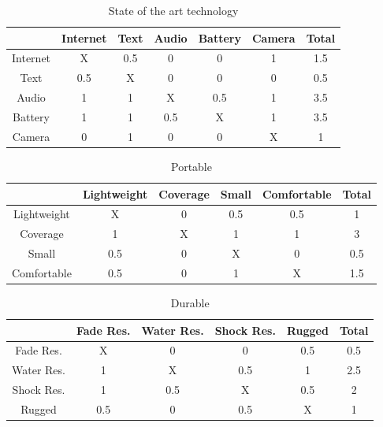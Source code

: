 \begin{enumerate}
\begin{onlysolution}
\begin{enumerate}
    \begin{table}
    \caption{State of the art technology}
    \begin{tabular}{c|c|c|c|c|c|c}
    				& Internet		& Text		& Audio	& Battery	 	& Camera	& Total			\\ \hline    			
	Internet		& X 			& 0.5		& 0			& 0				& 1			& 1.5 			\\ \hline    			
	Text			& 0.5 			& X			& 0			& 0				& 0	 		& 0.5		\\ \hline    			
	Audio		&  1			& 1			& X			& 0.5			& 1 		& 3.5		\\ \hline    			    
	Battery		&  1			& 1			& 0.5		& 	X			& 1 		& 3.5		\\ \hline    			
	Camera		& 0				& 1			& 0			& 0				& X 		& 1	
	\end{tabular}
	\end{table}
			
    \begin{table}
    \caption{Portable}
    \begin{tabular}{c|c|c|c|c|c}
    				& Lightweight	& Coverage	& Small		& Comfortable 	& Total			\\ \hline    			
	Lightweight	& X 			& 0			& 0.5		& 0.5			& 1 			\\ \hline    			
	Coverage	& 1	 			& X			& 1			& 1				& 3	 			\\ \hline    			
	Small		&  0.5			& 0			& X			& 0				& 0.5 			\\ \hline    			    
	Comfortable	&  0.5			& 0			& 1			& 	X			& 1.5 			\\ 			
	\end{tabular}
	\end{table}

    \begin{table}
    \caption{Durable}
    \begin{tabular}{c|c|c|c|c|c}
    				& Fade Res.	& Water Res.	& Shock Res.	& Rugged 	& Total			\\ \hline    			
	Fade Res.	& X 			& 0			& 0				& 0.5			& 0.5 			\\ \hline    			
	Water Res.	& 1	 			& X			& 0.5			& 1				& 2.5			\\ \hline    			
	Shock Res.	&  1			& 0.5		& X				& 0.5			& 2 			\\ \hline    			    
	Rugged		&  0.5			& 0			& 0.5			& 	X			& 1 			\\ 			
	\end{tabular}
	\end{table}




\end{enumerate}
\end{onlysolution}
\end{enumerate}
